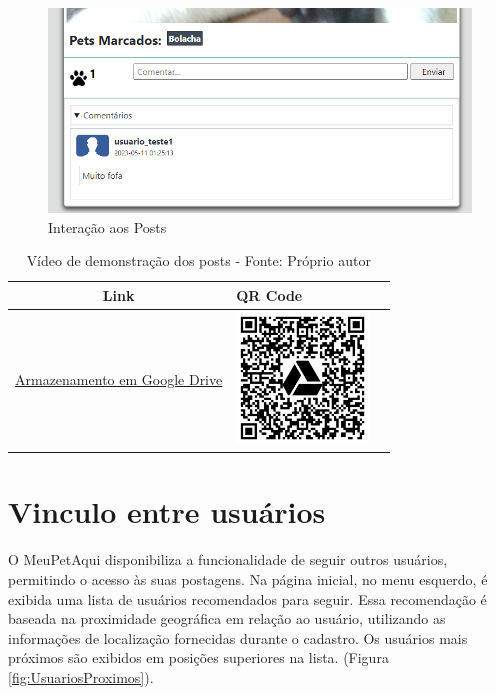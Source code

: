 \begin{figure}[htb]
     \centering
     \includegraphics[width=12cm]{arquivos/Figuras/image11.png}
     \caption{Interação aos Posts}
     \label{fig:InteraçãoAosPosts}
\end{figure}

\begin{table}[htbp]
\centering
\renewcommand{\arraystretch}{1.5}
\begin{tabular}{|c|>{\centering\arraybackslash}m{6cm}|c|}
\hline
\textbf{Link} & \textbf{QR Code} \\
\hline
\href{https://drive.google.com/file/d/1QR-FYXyBn2FoYs8XX4q8F1Ivxa3LxWyp/view?usp=drive_link}{Armazenamento em Google Drive} & \includegraphics[width=3.5cm]{arquivos/ImgLinks/posts.png} \\
\hline
\end{tabular}
\caption*{Vídeo de demonstração dos posts - Fonte: Próprio autor}
\end{table}

\newpage
\section{Vinculo entre usuários}
\label{sec:VinculoEntreUsuarios}
O MeuPetAqui disponibiliza a funcionalidade de seguir outros usuários, permitindo o acesso às suas postagens. Na página inicial, no menu esquerdo, é exibida uma lista de usuários recomendados para seguir. Essa recomendação é baseada na proximidade geográfica em relação ao usuário, utilizando as informações de localização fornecidas durante o cadastro. Os usuários mais próximos são exibidos em posições superiores na lista. (Figura \ref{fig:UsuariosProximos}).

